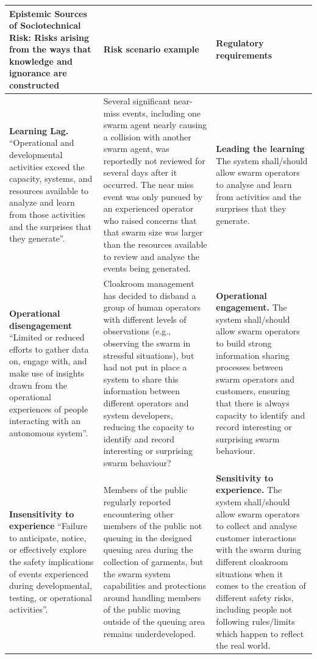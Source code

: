 \documentclass[lettersize,journal]{IEEEtran}
\begin{document}
\begin{landscape}
\begin{table}[]
    \centering
    \begin{tabular}{|p{0.3\textheight}|p{0.35\textheight}|p{0.35\textheight}|}
        \hline
         \textbf{Epistemic Sources of Sociotechnical Risk:} Risks arising from the ways that knowledge and ignorance are constructed & \textbf{Risk scenario example} & \textbf{Regulatory requirements} \\
         \hline
         \textbf{Learning Lag.} ``Operational and developmental activities exceed the capacity, systems, and resources available to analyze and learn from those activities and the surprises that they generate”. \cite{macrae2021learning} & Several significant near-miss events, including one swarm agent nearly causing a collision with another swarm agent, was reportedly not reviewed for several days after it occurred. The near miss event was only pursued by an experienced operator who raised concerns that that swarm size was larger than the resources available to review and analyse the events being generated. & \textbf{Leading the learning} The system shall/should allow swarm operators to analyse and learn from activities and the surprises that they generate. \\
         \hline
         \textbf{Operational disengagement} ``Limited or reduced efforts to gather data on, engage with, and make use of insights drawn from the operational experiences of people interacting with an autonomous system”. \cite{macrae2021learning} & Cloakroom management has decided to disband a group of human operators with different levels of observations (e.g., observing the swarm in stressful situations), but had not put in place a system to share this information between different operators and system developers, reducing the capacity to identify and record interesting or surprising swarm behaviour? & \textbf{Operational engagement.} The system shall/should allow swarm operators to build strong information sharing processes between swarm operators and customers, ensuring that there is always capacity to identify and record interesting or surprising swarm behaviour. \\ 
         \hline
         \textbf{Insensitivity to experience} ``Failure to anticipate, notice, or effectively explore the safety implications of events experienced during developmental, testing, or operational activities”. \cite{macrae2021learning} & Members of the public regularly reported encountering other members of the public not queuing in the designed queuing area during the collection of garments, but the swarm system capabilities and protections around handling members of the public moving outside of the queuing area remains underdeveloped. & \textbf{Sensitivity to experience.} The system shall/should allow swarm operators to collect and analyse customer interactions with the swarm during different cloakroom situations when it comes to the creation of different safety risks, including people not following rules/limits which happen to reflect the real world.\\

\end{tabular}
\end{table}
\end{landscape}
\end{document}
